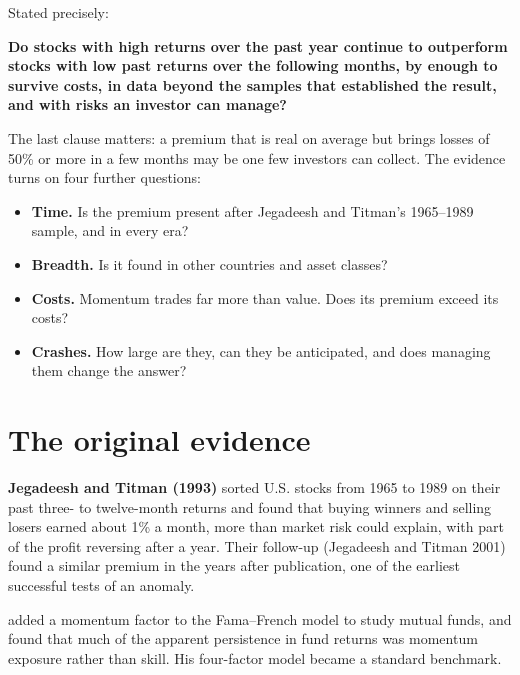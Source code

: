 Stated precisely:

\begin{callout}
\textbf{Do stocks with high returns over the past year continue to outperform stocks with low past returns over the following months, by enough to survive costs, in data beyond the samples that established the result, and with risks an investor can manage?}
\end{callout}

The last clause matters: a premium that is real on average but brings losses of 50\% or more in a few months may be one few investors can collect. The evidence turns on four further questions:

\begin{itemize}
  \item \textbf{Time.} Is the premium present after Jegadeesh and Titman's 1965--1989 sample, and in every era?
  \item \textbf{Breadth.} Is it found in other countries and asset classes?
  \item \textbf{Costs.} Momentum trades far more than value. Does its premium exceed its costs?
  \item \textbf{Crashes.} How large are they, can they be anticipated, and does managing them change the answer?
\end{itemize}

\section{The original evidence}
\label{sec:05-evidence}

\textbf{Jegadeesh and Titman (1993)} sorted U.S. stocks from 1965 to 1989 on their past three- to twelve-month returns and found that buying winners and selling losers earned about 1\% a month, more than market risk could explain, with part of the profit reversing after a year. Their follow-up (Jegadeesh and Titman 2001) found a similar premium in the years after publication, one of the earliest successful  tests of an anomaly.

 added a momentum factor to the Fama--French model to study mutual funds, and found that much of the apparent persistence in fund returns was momentum exposure rather than skill. His four-factor model became a standard benchmark.

